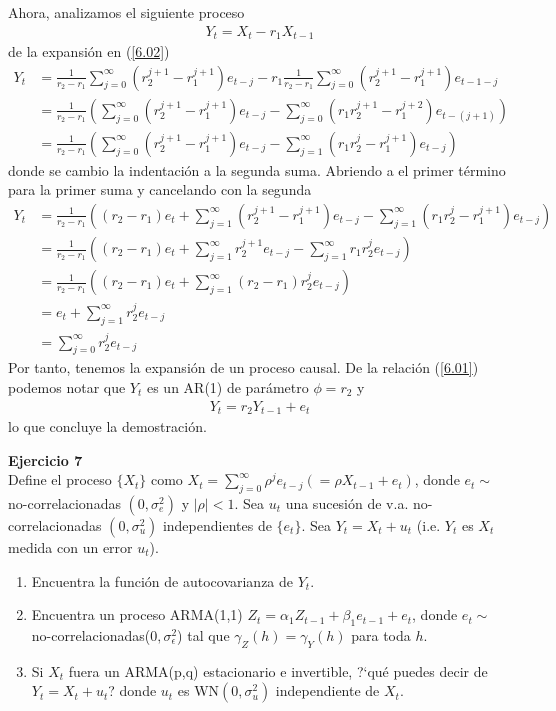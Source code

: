 \documentclass[a4paper, 11pt]{article}
\newenvironment{problem}[2][Ejercicio]
{ \begin{mdframed}[backgroundcolor= red!50] \textbf{#1 #2} \\}
	{  \end{mdframed}}
\begin{document}
Ahora, analizamos el siguiente proceso
\begin{align*}
    Y_t = X_t - r_1 X_{t-1}
\end{align*}
de la expansión en (\ref{6.02})
\begin{align*}
    Y_t &= \frac{1}{r_2-r_1} \sum_{j = 0}^{\infty} (r_2^{j+1}-r_1^{j+1}) e_{t-j } - r_1 \frac{1}{r_2-r_1} \sum_{j = 0}^{\infty} (r_2^{j+1}-r_1^{j+1}) e_{t-1-j }\\
    &= \frac{1}{r_2-r_1} \left( \sum_{j = 0}^{\infty} (r_2^{j+1}-r_1^{j+1}) e_{t-j } - \sum_{j =0 }^{\infty} (r_1r_2^{j+1}- r_1^{j+2} ) e_{t-(j+1)}\right) \\
    &= \frac{1}{r_2-r_1} \left( \sum_{j = 0}^{\infty} (r_2^{j+1}-r_1^{j+1}) e_{t-j } - \sum_{j =1 }^{\infty} (r_1r_2^{j}- r_1^{j+1} ) e_{t-j}\right)    
\end{align*}
donde se cambio la indentación a la segunda suma. Abriendo a el primer término para la primer suma y cancelando con la segunda
\begin{align*}
    Y_t &= \frac{1}{r_2-r_1} \left( (r_2 -r_1)e_t + \sum_{j = 1}^{\infty} (r_2^{j+1}-r_1^{j+1}) e_{t-j } - \sum_{j =1 }^{\infty} (r_1r_2^{j}- r_1^{j+1} ) e_{t-j}\right)\\
    &= \frac{1}{r_2-r_1} \left( (r_2 -r_1)e_t + \sum_{j = 1}^{\infty} r_2^{j+1} e_{t-j } - \sum_{j =1 }^{\infty} r_1r_2^{j}  e_{t-j}\right)\\
    &= \frac{1}{r_2-r_1} \left( (r_2 -r_1)e_t + \sum_{j = 1}^{\infty} (r_2-r_1)r_2^{j} e_{t-j } \right)\\
    &= e_t + \sum_{j=1}^{\infty} r_2^j e_{t-j}\\
    &= \sum_{j=0}^{\infty} r_2^j e_{t-j }
\end{align*}
Por tanto, tenemos la expansión de un proceso causal. De la relación (\ref{6.01}) podemos notar que $Y_t$ es un AR(1) de parámetro $\phi = r_2$ y 
\begin{align*}
    Y_t = r_2 Y_{t-1} + e_t 
\end{align*}
lo que concluye la demostración.


\begin{problem}{7} 
    Define el proceso $\{ X_t\}$ como $X_t = \sum_{j=0}^{\infty}\rho^j e_{t-j }(=\rho X_{t-1} + e_t )$, donde $e_t\sim$ no-correlacionadas $(0,\sigma^2_e)$ y $ |\rho |<1 $. Sea $u_t$ una sucesión de v.a. no-correlacionadas $(0,\sigma^2_u)$ independientes de $\{e_t\}$. Sea $Y_t = X_t + u_t$ (i.e. $Y_t$ es $X_t$ medida con un error $u_t$). 
    \begin{enumerate}
        \item Encuentra la función de autocovarianza de $Y_t$. 
        \item Encuentra un proceso ARMA(1,1) $Z_t = \alpha_1 Z_{t-1} + \beta_1 e_{t-1} + e_t $, donde $e_t \sim$ no-correlacionadas($0,\sigma^2_\epsilon$) tal que $\gamma_Z(h ) = \gamma_Y(h )$ para toda $h$.
        \item Si $X_t$ fuera un ARMA(p,q) estacionario e invertible, ?`qué puedes decir de $Y_t = X_t + u_t $? donde $u_t$ es WN$(0,\sigma^2_u )$ independiente de $X_t$. 
    \end{enumerate} 
\end{problem}
\end{document}
